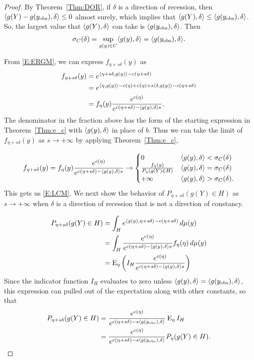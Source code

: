 \begin{proof}
By Theorem~\ref{Thm:DOR}, if $\delta$ is a direction of recession, then 
$\langle g(Y) - g(y_{\text{obs}}), \delta \rangle \leq 0$ almost surely, which implies 
that $\langle g(Y), \delta \rangle \leq \langle g(y_{\text{obs}}), \delta \rangle$.  
So, the largest value that $\langle g(Y), \delta \rangle$ can take is 
$\langle g(y_{\text{obs}}), \delta \rangle$.  Then 
\begin{align*}
\sigma_C(\delta) = \sup_{g(y) \in C}\langle g(y), \delta \rangle = 
\langle g(y_{\text{obs}}), \delta \rangle.
\end{align*}

From \eqref{E:ERGM}, we can express $f_{\eta+s\delta}(y)$ as
\begin{align*}
 f_{\eta+s\delta}(y) &= e^{ \langle \eta+s\delta,g(y) \rangle - c(\eta+s\delta)  } \\
 &= e^{ \langle \eta,g(y) \rangle -c(\eta)+c(\eta) + s\langle \delta,g(y) \rangle - c(\eta+s\delta) } \\
 	&= f_\eta(y) \frac{e^{c(\eta)}}{e^{ c(\eta+s\delta) - \langle g(y),\delta \rangle
s } }.
\end{align*}
The denominator in the fraction above has the form of the starting expression in 
Theorem~\ref{Thm:e_c} with $\langle g(y),\delta \rangle$ in place of $b$.
Thus we can take the limit of $f_{\eta+s\delta}(y) $ as
$s \to +\infty$ by applying Theorem~\ref{Thm:e_c},

\begin{align*}
	f_{\eta+s\delta}(y) = f_\eta(y) \frac{e^{c(\eta)}}{e^{ c(\eta+s
\delta) - \langle g(y),\delta \rangle s } } 
	\to	
			\begin{cases} 
			0 					& \langle g(y),\delta \rangle < \sigma_C(\delta) \\
			\frac{f_\eta(y)}{P_\eta(g(Y) \in H)} 	& 
								\langle g(y),\delta \rangle = \sigma_C(\delta) \\
			+\infty				& \langle g(y),\delta \rangle > \sigma_C(\delta).
			\end{cases}
\end{align*}
This gets us \eqref{E:LCM}.  We next show the behavior of 
$P_{\eta+s\delta}(g(Y) \in H)$ as $s \to +\infty$ when $\delta$ is a direction of
recession that is not a direction of constancy.

\begin{align*}
 P_{\eta+s\delta}(g(Y) \in H) &= \int_H e^{\langle g(y), \eta+s\delta \rangle - c(\eta
+s\delta)} \, d\mu(y) \\
		&= \int_H  \frac{e^{c(\eta)}}{e^{c(\eta+s\delta)-\langle g(y),\delta \rangle s}} 
					f_\eta(\eta) \, d\mu(y)\\
		&= \operatorname{E}_\eta  \left ( I_H \frac{e^{c(\eta)}}{e^{c(\eta+s\delta)-\langle g(y),\delta \rangle s}} \right )
\end{align*}
Since the indicator function $I_H$ evaluates to zero unless 
$\langle  g(y), \delta \rangle = \langle  g(y_{\text{obs}}), \delta \rangle $,  
this expression can pulled out of the expectation along with other constants, so that 
\begin{align*}
		 P_{\eta+s\delta}(g(Y) \in H)
		 &= \frac{e^{c(\eta)} }{ e^{ c(\eta+s\delta) -s\langle g(y_{\text{obs}}),\delta \rangle } }
		 \operatorname{E}_\eta  I_H   \\
		 &= \frac{e^{c(\eta)} }{ e^{ c(\eta+s\delta) -s\langle g(y_{\text{obs}}),\delta \rangle } }
		 P_\eta  (g(Y) \in H). 
		 \end{align*}
 

\end{proof}

